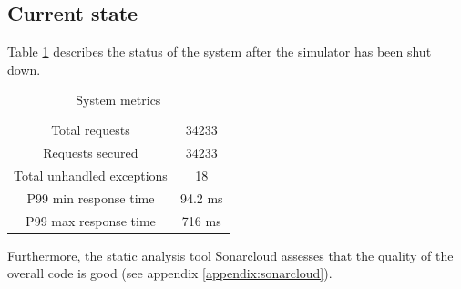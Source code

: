 \subsection{Current state}
Table \ref{current-table} describes the status of the system after the simulator has been shut down.
\begin{table}[H]
    \begin{center}
        \begin{tabular}{ |c|c| }
            \hline
            Total requests & 34233 \\
            Requests secured & 34233 \\
            Total unhandled exceptions & 18 \\
            P99 min response time & 94.2 ms \\
            P99 max response time & 716 ms \\
            \hline
        \end{tabular}
    \end{center}
    \caption{System metrics}
    \label{current-table}
\end{table}
Furthermore, the static analysis tool Sonarcloud assesses that the quality of the overall code is good (see appendix \ref{appendix:sonarcloud}).

